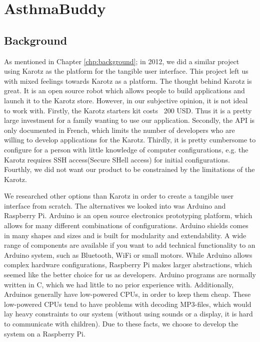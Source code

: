 \chapter{AsthmaBuddy}
\label{chp:our-solution}

\section{Background}
As mentioned in Chapter \ref{chp:background}; in 2012, we did a similar project using Karotz as the platform for the tangible user interface\cite{CustomerDriven}.
This project left us with mixed feelings towards Karotz as a platform. The thought behind Karotz is great. It is an open source robot which allows people to build applications and launch it to the Karotz store. However, in our subjective opinion, it is not ideal to work with. Firstly, the Karotz starters kit costs ~200 USD. Thus it is a pretty large investment for a family wanting to use our application. Secondly, the API is only documented in French, which limits the number of developers who are willing to develop applications for the Karotz. Thirdly, it is pretty cumbersome to configure for a person with little knowledge of computer configurations, e.g. the Karotz requires SSH access(Secure SHell access) for initial configurations. Fourthly, we did not want our product to be constrained by the limitations of the Karotz.

We researched other options than Karotz in order to create a tangible user interface from scratch. The alternatives we looked into was Arduino and Raspberry Pi. Arduino is an open source electronics prototyping platform\cite{arduino}, which allows for many different combinations of configurations. Arduino shields comes in many shapes and sizes and is built for modularity and extendability. A wide range of components are available if you want to add technical functionality to an Arduino system, such as Bluetooth, WiFi or small motors. 
While Arduino allows complex hardware configurations, Raspberry Pi makes larger abstractions, which seemed like the better choice for us as developers. Arduino programs are normally written in C\cite{strahl2000language}, which we had little to no prior experience with. Additionally, Arduinos generally have low-powered CPUs, in order to keep them cheap. These low-powered CPUs tend to have problems with decoding MP3-files, which would lay heavy constraints to our system (without using sounds or a display, it is hard to communicate with children). Due to these facts, we choose to develop the system on a Raspberry Pi.

